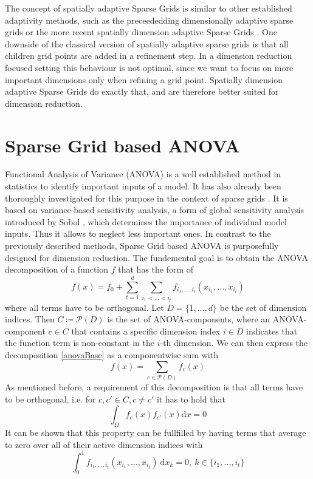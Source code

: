 \documentclass[
  a4paper,  %
  twoside,  %
  bibliography=totoc,
  headsepline,
  cleardoublepage=empty,
  parskip=half,
  draft=false
]{scrbook}
\begin{document}
The concept of spatially adaptive Sparse Grids is similar to other established adaptivity methods, such as the preceededding dimensionally adaptive sparse grids \cite{} or the more recent spatially dimension adaptive Sparse Grids \cite{}.
One downside of the classical version of spatially adaptive sparse grids is that all children grid points are added in a refinement step.
In a dimension reduction focused setting this behaviour is not optimal, since we want to focus on more important dimensions only when refining a grid point.
Spatially dimension adaptive Sparse Grids do exactly that, and are therefore better suited for dimension reduction.

\section{Sparse Grid based ANOVA}

Functional Analysis of Variance (ANOVA)  is a well established method in statistics to identify important inputs of a model.
It has also already been thoroughly investigated for this purpose in the context of sparse grids \cite{F10}.
It is based on variance-based sensitivity analysis, a form of global sensitivity analysis introduced by Sobol \cite{S01}, which determines the importance of individual model inputs.
Thus it allows to neglect less important ones.
In contrast to the previously described methods, Sparse Grid based ANOVA is purposefully designed for dimension reduction.
The fundemental goal is to obtain the ANOVA decomposition of a function $f$ that has the form of
\begin{equation}
f(x)=f_0 + \sum_{t=1}^d \sum_{i_1 < \dots < i_t} f_{i_1,\dots,i_t}(x_{i_1},\dots,x_{i_t})
\label{anovaBase}
\end{equation}
where all terms have to be orthogonal.
Let $D=\{1,\dots,d\}$ be the set of dimension indices.
Then $C \coloneqq \mathcal{P}(D)$ is the set of ANOVA-components, where an ANOVA-component $c \in C$ that contains a specific dimension index $i \in D$ indicates that the function term is non-constant in the $i$-th dimension.
We can then express the decomposition \eqref{anovaBase} as a componentwise sum with
\begin{equation}
f(x)=\sum_{c \in \mathcal{P}(D)} f_{c}(x)
\label{anovaComp}
\end{equation}
As mentioned before, a requirement of this decomposition is that all terms have to be orthogonal, i.e. for $c,c' \in C, c \neq c'$ it has to hold that
\begin{equation}
\int_{\Omega} f_c(x) f_{c'}(x) \text{d}x = 0
\end{equation}
It can be shown that this property can be fullfilled by having terms that average to zero over all of their active dimension indices with
\begin{equation}
\int_0^1 f_{i_1,\dots,i_t}(x_{i_1},\dots,x_{i_t}) ~ \text{d}x_k = 0, ~ k \in \{i_1, \dots, i_t\}
\end{equation}
\end{document}
